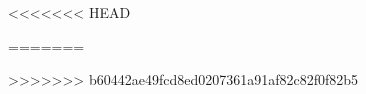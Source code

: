 \documentclass[11pt, twoside, a4paper]{article}
\begin{document}


<<<<<<< HEAD


=======


%
>>>>>>> b60442ae49fcd8ed0207361a91af82c82f0f82b5
\end{document}

